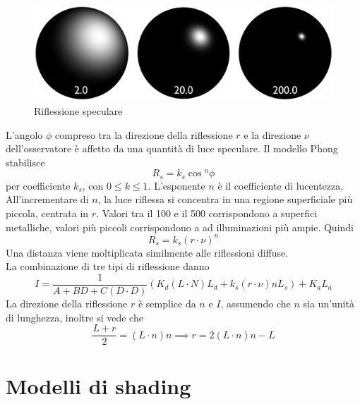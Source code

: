 \documentclass[9pt,a4paper,twoside]{tau}
\begin{document}
\begin{enumerate}
		\begin{figure}[H]
	        \centering
	        \includegraphics[width=0.6\columnwidth]{Figures/06.png}
	        \caption{Riflessione speculare}
	        \label{fig:figure}
		\end{figure} 
		L'angolo $\phi$ compreso tra la direzione della riflessione $r$ e la direzione $\nu$ dell'osservatore è affetto da una quantità di luce speculare. Il modello Phong stabilisce
		\begin{equation*}
			R_s = k_s \cos{^n}{\phi}
		\end{equation*}
		per coefficiente $k_s$, con $0 \leq k \leq 1$. L'esponente $n$ è il coefficiente di lucentezza. All'incrementare di $n$, la luce riflessa si concentra in una regione superficiale più piccola, centrata in $r$. Valori tra il 100 e il 500 corrispondono a superfici metalliche, valori più piccoli corrispondono a ad illuminazioni più ampie. Quindi
		\begin{equation*}
			R_s = k_s(r \cdot \nu )^n
		\end{equation*}
		Una distanza viene moltiplicata similmente alle riflessioni diffuse.\\
		La combinazione di tre tipi di riflessione danno
		\begin{equation*}
			I=\frac{1}{A + BD + C(D \cdot D)}(K_d(L \cdot N)L_d + k_s(r \cdot \nu)nL_s) + K_aL_a
		\end{equation*}
		La direzione della riflessione $r$ è semplice da $n$ e $I$, assumendo che $n$ sia un'unità di lunghezza, inoltre si vede che
		\begin{equation*}
			\frac{L+r}{2}=(L \cdot n)n \implies r = 2(L \cdot n)n - L
		\end{equation*}
\end{enumerate}

\section{Modelli di shading}
    
\end{document}
